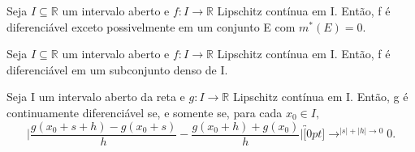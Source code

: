 \documentclass[analysis_notes.tex]{subfiles}
\begin{document}
\begin{crl*}
	Seja \(I\subseteq{\mathbb{R}}\) um intervalo aberto e \(f:I\rightarrow \mathbb{R}\) Lipschitz contínua em I.
	Então, f é diferenciável exceto possivelmente em um conjunto E com \(m^{*}(E) = 0.\)
\end{crl*}
\begin{crl*}
	Seja \(I\subseteq{\mathbb{R}}\) um intervalo aberto e \(f:I\rightarrow \mathbb{R}\) Lipschitz contínua em I. Então, f é diferenciável em um
	subconjunto denso de I.
\end{crl*}
\begin{theorem*}
	Seja I um intervalo aberto da reta e \(g:I\rightarrow \mathbb{R}\) Lipschitz contínua
	em I. Então, g é continuamente diferenciável se, e somente se, para cada \(x_{0}\in I,\)
	\[
		\biggl|\frac{g(x_{0}+s+h)-g(x_{0}+s)}{h}-\frac{g(x_{0}+h)+g(x_{0})}{h}\biggr|\overbracket[0pt]{\longrightarrow}^{|s|+|h|\to 0}0.
	\]
\end{theorem*}
\end{document}
